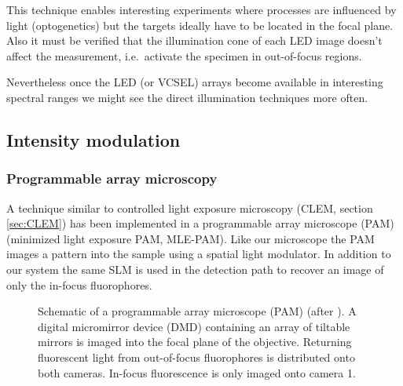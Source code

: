 
This technique enables interesting experiments where processes are
influenced by light (optogenetics) but the targets ideally have to be
located in the focal plane. Also it must be verified that the
illumination cone of each LED image doesn't affect the measurement,
i.e.\ activate the specimen in out-of-focus regions.

Nevertheless once the LED (or VCSEL) arrays become available in
interesting spectral ranges we might see the direct illumination
techniques more often.

\subsection{Intensity modulation}
\subsubsection{Programmable array microscopy}
A technique similar to controlled light exposure microscopy (CLEM,
section \ref{sec:CLEM}) has been implemented in a programmable array
microscope (PAM) \citep{Caarls2011} (minimized light exposure PAM,
MLE-PAM). Like our microscope the PAM images a pattern into the sample
using a spatial light modulator. In addition to our system the same
SLM is used in the detection path to recover an image of only the
in-focus fluorophores.

\begin{figure}[!hbt]
  \centering
  
  \caption{Schematic of a programmable array microscope (PAM) (after
    \cite{Verveer1998}). A digital micromirror device (DMD) containing
    an array of tiltable mirrors is imaged into the focal plane of the
    objective. Returning fluorescent light from out-of-focus
    fluorophores is distributed onto both cameras. In-focus
    fluorescence is only imaged onto camera 1.}
  \label{fig:pam-sketch}
\end{figure}


%
%
%

